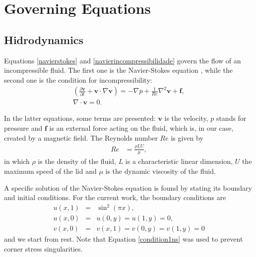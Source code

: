 \documentclass[journal]{IEEEtran}
\begin{document}
\section{Governing Equations}
\subsection{Hidrodynamics}
Equations \ref{navierstokes} and \ref{navierincompressibilidade} govern the flow of an incompressible fluid. The first one is the Navier-Stokes equation \cite{batchelor}, while the second one is the condition for incompressibility: \begin{eqnarray}
\left( \frac{\partial {\textbf{v}}}{\partial t}+\textbf{v}\cdot\nabla \textbf{v} \right)=-\nabla p+\frac{1}{\mathit{Re}}\nabla^2 \textbf{v} + \textbf{f}\label{navierstokes},\\
\nabla\cdot\textbf{v}=0.\label{navierincompressibilidade}
\end{eqnarray}

In the latter equations, some terms are presented: $\mathbf{v}$ is the velocity, $p$ stands for pressure and $\mathbf{f}$ is an external force acting on the fluid, which is, in our case, created by a magnetic field. The Reynolds number $\mathit{Re}$ is given by  \begin{align}
	\mathit{Re} &= \frac{\rho  L  U}{\mu},
\end{align} in which $\rho$ is the density of the fluid, $L$ is a characteristic linear dimension, $U$ the maximum speed of the lid and $\mu$ is the dynamic viscosity of the fluid.

A specific solution of the Navier-Stokes equation is found by stating its boundary and initial conditions. For the current work, the boundary conditions are \begin{eqnarray}
u(x,1) & = & \sin^2(\pi x),\label{condition1ns}\\
u(x,0) & = & u(0,y) = u(1,y) = 0,\label{condition2ns}\\
v(x,0) & = & v(x,1) = v(0, y) = v(1, y) = 0\label{condition3ns}
\end{eqnarray} and we start from rest. Note that Equation \ref{condition1ns} was used to prevent corner stress singularities.
\end{document}

